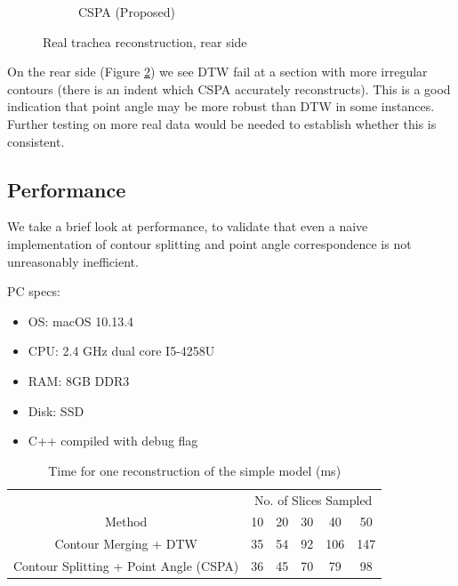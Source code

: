 \documentclass[11p, titlepage]{article}
\begin{document}
\begin{figure}[h!]
\begin{subfigure}[b]{0.45\textwidth}
         \caption{CSPA (Proposed)}
         \label{fig:cspa50_real_back}
     \end{subfigure}
        \caption{Real trachea reconstruction, rear side}
        \label{fig:real_reconstructions_back}
\end{figure}

On the rear side (Figure \ref{fig:real_reconstructions_back}) we see DTW fail at a section with more irregular contours (there is an indent which CSPA accurately reconstructs). This is a good indication that point angle may be more robust than DTW in some instances. Further testing on more real data would be needed to establish whether this is consistent.
\pagebreak

\subsection{Performance}

We take a brief look at performance, to validate that even a naive implementation of contour splitting and point angle correspondence is not unreasonably inefficient.

PC specs:
\begin{itemize}
\item OS: macOS 10.13.4
\item CPU: 2.4 GHz dual core I5-4258U
\item RAM: 8GB DDR3
\item Disk: SSD
\item C++ compiled with debug flag
\end{itemize}

\begin{table}[h!]
\begin{tabular}{ | c | c | c | c | c | c | }
\hline
& \multicolumn{5}{c|}{No. of Slices Sampled} \\
\cline{2-6}
Method & 10 & 20 & 30 & 40 & 50 \\
\hline
Contour Merging + DTW & 35 & 54 & 92 & 106 & 147 \\
Contour Splitting + Point Angle (CSPA) & 36 & 45 & 70 & 79 & 98 \\
\hline
\end{tabular}
\caption{Time for one reconstruction of the simple model (ms)}
\label{table:performance_simple}
\end{table}
\end{document}
